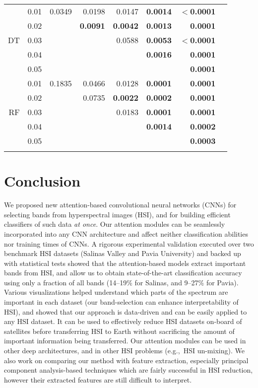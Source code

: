 \documentclass[journal]{IEEEtran}
\begin{document}
\begin{table}[ht!]
\begin{tabular}{rcrrrrrr}
                      \hline
                      & 0.01 & 0.0349 & 0.0198 & 0.0147 & \textbf{0.0014}  &  \textbf{$<$0.0001} \\
	                  & 0.02 &  & \textbf{0.0091} & \textbf{0.0042} & \textbf{0.0013} & \textbf{0.0001}  \\
		      DT      & 0.03 &  &  & 0.0588 & \textbf{0.0053} & \textbf{$<$0.0001}  \\
                      & 0.04 &  &  &  & \textbf{0.0016} &  \textbf{0.0001} \\
                      & 0.05 &  &  &  &  &  \textbf{0.0001} \\
                      \hline
                      & 0.01 & 0.1835 & 0.0466 & 0.0128 & \textbf{0.0001} & \textbf{0.0001}  \\
	                  & 0.02 &  & 0.0735 & \textbf{0.0022} & \textbf{0.0002} & \textbf{0.0001}  \\
		      RF      & 0.03 &  &  & 0.0183 & \textbf{0.0001} & \textbf{0.0001}  \\
                      & 0.04 &  &  &  & \textbf{0.0014} &  \textbf{0.0002} \\
                      & 0.05 &  &  &  &  & \textbf{0.0003}  \\
\hline
		\Xhline{2\arrayrulewidth}
	\end{tabular}
\end{table}
\section{Conclusion}\label{sec:conclusions}

We proposed new attention-based convolutional neural networks (CNNs) for selecting bands from hyperspectral images (HSI), and for building efficient classifiers of such data \emph{at once}. Our attention modules can be seamlessly incorporated into any CNN architecture and affect neither classification abilities nor training times of CNNs. A rigorous experimental validation executed over two benchmark HSI datasets (Salinas Valley and Pavia University) and backed up with statistical tests showed that the attention-based models extract important bands from HSI, and allow us to obtain state-of-the-art classification accuracy using only a fraction of all bands (14--19\% for Salinas, and 9--27\% for Pavia). Various visualizations helped understand which parts of the spectrum are important in each dataset (our band-selection can enhance interpretability of HSI), and showed that our approach is data-driven and can be easily applied to any HSI dataset. It can be used to effectively reduce HSI datasets on-board of satellites before transferring HSI to Earth without sacrificing the amount of important information being transferred. Our attention modules can be used in other deep architectures, and in other HSI problems (e.g.,~HSI un-mixing). We also work on comparing our method with feature extraction, especially principal component analysis-based techniques which are fairly successful in HSI reduction, however their extracted features are still difficult to interpret.
\end{document}

